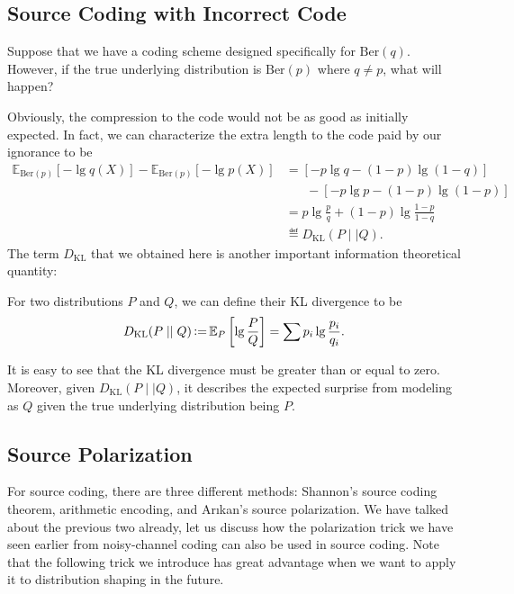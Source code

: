 \subsection{Source Coding with Incorrect Code}
Suppose that we have a coding scheme designed specifically for $\mathrm{Ber}(q)$. However, if the true underlying distribution is $\mathrm{Ber}(p)$ where $q\neq p$, what will happen?

Obviously, the compression to the code would not be as good as initially expected. In fact, we can characterize the extra length to the code paid by our ignorance to be
\begin{align*}
    \mathbb{E}_{\mathrm{Ber}(p)}\left[-\lg q(X)\right] - \mathbb{E}_{\mathrm{Ber}(p)}\left[-\lg p(X)\right] &= \left[-p\lg q - (1-p)\lg(1-q)\right] \\
    &\;\;\;\;\;\;- \left[-p\lg p - (1-p)\lg(1-p)\right] \\
    &= p\lg\frac{p}{q} + (1-p)\lg\frac{1-p}{1-q} \\
    &\eqdef D_{\mathrm{KL}}(P\mid\mid Q).
\end{align*}
The term $D_{\mathrm{KL}}$ that we obtained here is another important information theoretical quantity:
\begin{definition}
    For two distributions $P$ and $Q$, we can define their KL divergence to be
    \begin{equation}
        D_\mathrm{KL}(P\mid\mid Q) \operatorname{\vcentcolon=} \mathbb{E}_{P}\left[\lg\frac{P}{Q}\right] = \sum p_i \lg\frac{p_i}{q_i}.
    \end{equation}
\end{definition}
It is easy to see that the KL divergence must be greater than or equal to zero. Moreover, given $D_{\mathrm{KL}}(P\mid\mid Q)$, it describes the expected surprise from modeling as $Q$ given the true underlying distribution being $P$.

\subsection{Source Polarization}
For source coding, there are three different methods: Shannon's source coding theorem, arithmetic encoding, and Ar{\i}kan's source polarization. We have talked about the previous two already, let us discuss how the polarization trick we have seen earlier from noisy-channel coding can also be used in source coding. Note that the following trick we introduce has great advantage when we want to apply it to distribution shaping in the future.

